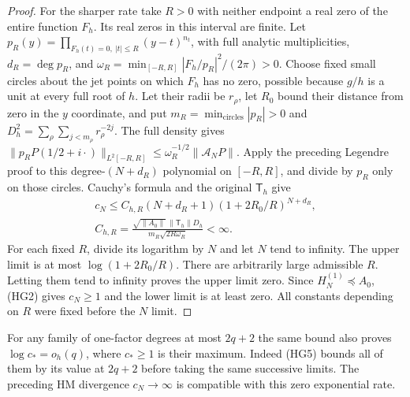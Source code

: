 \begin{proof}
For the sharper rate take $R>0$ with neither endpoint a real zero
of the entire function $F_h$. Its real zeros in this interval are
finite. Let $p_R(y)=\prod_{F_h(t)=0,\ |t|\le R}(y-t)^{n_t}$,
with full analytic multiplicities, $d_R=\deg p_R$, and
$\omega_R=\min_{[-R,R]}|F_h/p_R|^2/(2\pi)>0$.
Choose fixed small circles about the jet points on which $F_h$ has no
zero, possible because $g/h$ is a unit at every full root of $h$.
Let their radii be $r_\rho$, let $R_0$ bound their distance from zero
in the $y$ coordinate, and put
$m_R=\min_{\text{circles}}|p_R|>0$ and
$D_h^2=\sum_{\rho}\sum_{j<m_\rho}r_\rho^{-2j}$.
The full density gives
$\|p_R P(1/2+i\cdot)\|_{L^2[-R,R]}
\le\omega_R^{-1/2}\|\mathcal A_NP\|$.
Apply the preceding Legendre proof to this degree-$(N+d_R)$
polynomial on $[-R,R]$, and divide by $p_R$ only on those circles.
Cauchy's formula and the original $\mathsf T_h$ give
\[
 \begin{gathered}
 c_N\le C_{h,R}(N+d_R+1)(1+2R_0/R)^{N+d_R},\\
 C_{h,R}=\frac{\sqrt{\|A_0\|}\,\|\mathsf T_h\|D_h}
                    {m_R\sqrt{2R\omega_R}}<\infty .
 \end{gathered}\tag{HG5}
\]
For each fixed $R$, divide its logarithm by $N$ and let $N$ tend
to infinity. The upper limit is at most $\log(1+2R_0/R)$.
There are arbitrarily large admissible $R$. Letting them tend to
infinity proves the upper limit zero. Since $H_N^{(1)}\preceq A_0$,
(HG2) gives $c_N\ge1$ and the lower limit is at least zero.
All constants depending on $R$ were fixed before the $N$ limit.
\end{proof}
For any family of one-factor degrees at most $2q+2$ the same bound
also proves $\log c_*=o_h(q)$, where $c_*\ge1$ is their maximum.
Indeed (HG5) bounds all of them by its value at $2q+2$ before
taking the same successive limits. The preceding HM divergence
$c_N\to\infty$ is compatible with this zero exponential rate.

